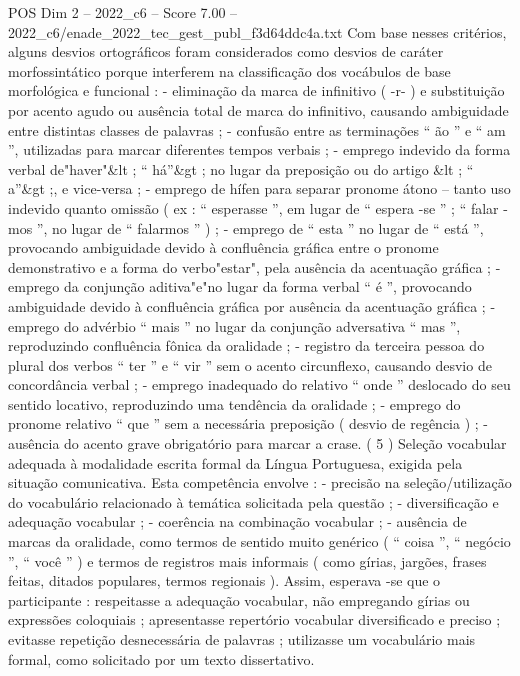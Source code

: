 \begin{textsample}{POS Dim 2 – 2022\_c6 – Score 7.00 – 2022\_c6/enade\_2022\_tec\_gest\_publ\_f3d64ddc4a.txt}
Com base nesses critérios, alguns desvios ortográficos foram considerados como desvios de caráter morfossintático porque interferem na classificação dos vocábulos de base morfológica e funcional : - eliminação da marca de infinitivo ( -r- ) e substituição por acento agudo ou ausência total de marca do infinitivo, causando ambiguidade entre distintas classes de palavras ; - confusão entre as terminações “ ão ” e “ am ”, utilizadas para marcar diferentes tempos verbais ; - emprego indevido da forma verbal de"haver"\&lt ; “ há”\&gt ; no lugar da preposição ou do artigo \&lt ; “ a”\&gt ;, e vice-versa ; - emprego de hífen para separar pronome átono – tanto uso indevido quanto omissão ( ex : “ esperasse ”, em lugar de “ espera -se ” ; “ falar -mos ”, no lugar de “ falarmos ” ) ; - emprego de “ esta ” no lugar de “ está ”, provocando ambiguidade devido à confluência gráfica entre o pronome demonstrativo e a forma do verbo"estar", pela ausência da acentuação gráfica ; - emprego da conjunção aditiva"e"no lugar da forma verbal “ é ”, provocando ambiguidade devido à confluência gráfica por ausência da acentuação gráfica ; - emprego do advérbio “ mais ” no lugar da conjunção adversativa “ mas ”, reproduzindo confluência fônica da oralidade ; - registro da terceira pessoa do plural dos verbos “ ter ” e “ vir ” sem o acento circunflexo, causando desvio de concordância verbal ; - emprego inadequado do relativo “ onde ” deslocado do seu sentido locativo, reproduzindo uma tendência da oralidade ; - emprego do pronome relativo “ que ” sem a necessária preposição ( desvio de regência ) ; - ausência do acento grave obrigatório para marcar a crase. ( 5 ) Seleção vocabular adequada à modalidade escrita formal da Língua Portuguesa, exigida pela situação comunicativa.
Esta competência envolve : - precisão na seleção/utilização do vocabulário relacionado à temática solicitada pela questão ; - diversificação e adequação vocabular ; - coerência na combinação vocabular ; - ausência de marcas da oralidade, como termos de sentido muito genérico ( “ coisa ”, “ negócio ”, “ você ” ) e termos de registros mais informais ( como gírias, jargões, frases feitas, ditados populares, termos regionais ).
Assim, esperava -se que o participante : respeitasse a adequação vocabular, não empregando gírias ou expressões coloquiais ; apresentasse repertório vocabular diversificado e preciso ; evitasse repetição desnecessária de palavras ; utilizasse um vocabulário mais formal, como solicitado por um texto dissertativo.

\end{textsample}
